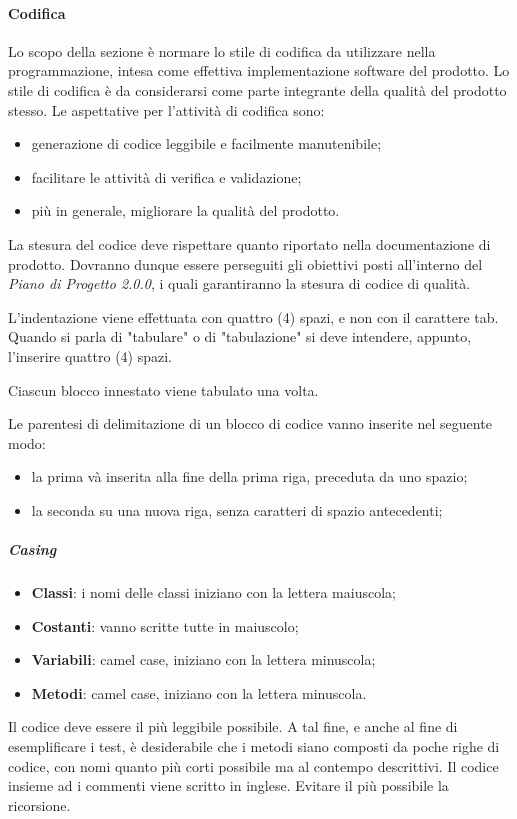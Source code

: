 		\paragraph{Codifica}
	    Lo scopo della sezione è normare lo stile di codifica da utilizzare nella programmazione, intesa come effettiva implementazione software del prodotto. Lo stile di codifica è da considerarsi come parte integrante della qualità del prodotto stesso.
	    Le aspettative per l'attività di codifica sono:
	    \begin{itemize}
	    	\item generazione di codice leggibile e facilmente manutenibile; 
	    	\item facilitare le attività di verifica e validazione;
	    	\item più in generale, migliorare la qualità del prodotto.
	    \end{itemize}
	    La stesura del codice deve rispettare quanto riportato nella documentazione di prodotto. Dovranno dunque essere perseguiti gli obiettivi posti all'interno del \textit{Piano di Progetto 2.0.0}, i quali garantiranno la stesura di codice di qualità.
	    
	    L'indentazione viene effettuata con quattro (4) spazi, e non con il carattere tab. Quando si parla di "tabulare" o di "tabulazione" si deve intendere, appunto, l'inserire quattro (4) spazi.
	    
	    Ciascun blocco innestato viene tabulato una volta.
	    
	    Le parentesi di delimitazione di un blocco di codice vanno inserite nel seguente modo:
	    \begin{itemize}
	        \item la prima và inserita alla fine della prima riga, preceduta da uno spazio;
	        \item la seconda su una nuova riga, senza caratteri di spazio antecedenti;
	    \end{itemize}
	    
	    \subparagraph{Casing}
	    \begin{itemize}
	        \item \textbf{Classi}: i nomi delle classi iniziano con la lettera maiuscola;
	        \item \textbf{Costanti}: vanno scritte tutte in maiuscolo;
	        \item \textbf{Variabili}: camel case, iniziano con la lettera minuscola;
	        \item \textbf{Metodi}: camel case, iniziano con la lettera minuscola.
	    \end{itemize}
	    Il codice deve essere il più leggibile possibile. A tal fine, e anche al fine di esemplificare i test, è desiderabile che i metodi siano composti da poche righe di codice, con nomi quanto più corti possibile ma al contempo descrittivi.
	    Il codice insieme ad i commenti viene scritto in inglese.
	    Evitare il più possibile la ricorsione.
